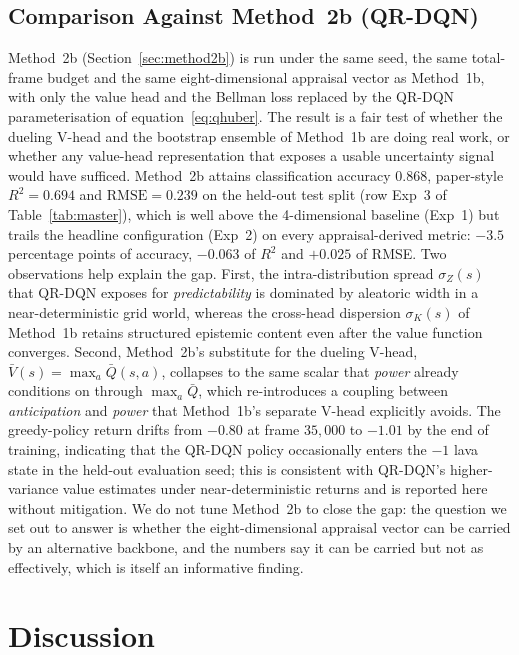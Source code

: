 \documentclass[conference]{IEEEtran}
\begin{document}
\subsection{Comparison Against Method~2b (QR-DQN)}
\label{sec:method2_results}
Method~2b (Section~\ref{sec:method2b}) is run under the same seed, the
same total-frame budget and the same eight-dimensional appraisal vector
as Method~1b, with only the value head and the Bellman loss replaced by
the QR-DQN parameterisation of equation~\eqref{eq:qhuber}. The result
is a fair test of whether the dueling V-head and the bootstrap ensemble
of Method~1b are doing real work, or whether any value-head
representation that exposes a usable uncertainty signal would have
sufficed. Method~2b attains classification accuracy $0.868$, paper-style
$R^{2} = 0.694$ and $\text{RMSE} = 0.239$ on the held-out test split
(row Exp~3 of Table~\ref{tab:master}), which is well above the
4-dimensional baseline (Exp~1) but trails the headline configuration
(Exp~2) on every appraisal-derived metric: $-3.5$ percentage points of
accuracy, $-0.063$ of $R^{2}$ and $+0.025$ of RMSE. Two observations
help explain the gap. First, the intra-distribution spread
$\sigma_{Z}(s)$ that QR-DQN exposes for \emph{predictability} is
dominated by aleatoric width in a near-deterministic grid world,
whereas the cross-head dispersion $\sigma_{K}(s)$ of Method~1b retains
structured epistemic content even after the value function converges.
Second, Method~2b's substitute for the dueling V-head,
$\bar V(s) = \max_{a} \bar Q(s, a)$, collapses to the same scalar that
\emph{power} already conditions on through $\max_{a}\bar Q$, which
re-introduces a coupling between \emph{anticipation} and \emph{power}
that Method~1b's separate V-head explicitly avoids. The greedy-policy
return drifts from $-0.80$ at frame $35{,}000$ to $-1.01$ by the end of
training, indicating that the QR-DQN policy occasionally enters the
$-1$ lava state in the held-out evaluation seed; this is consistent
with QR-DQN's higher-variance value estimates under near-deterministic
returns and is reported here without mitigation. We do not tune
Method~2b to close the gap: the question we set out to answer is whether
the eight-dimensional appraisal vector can be carried by an alternative
backbone, and the numbers say it can be carried but not as effectively,
which is itself an informative finding.

\section{Discussion}
\label{sec:discussion}
\end{document}
